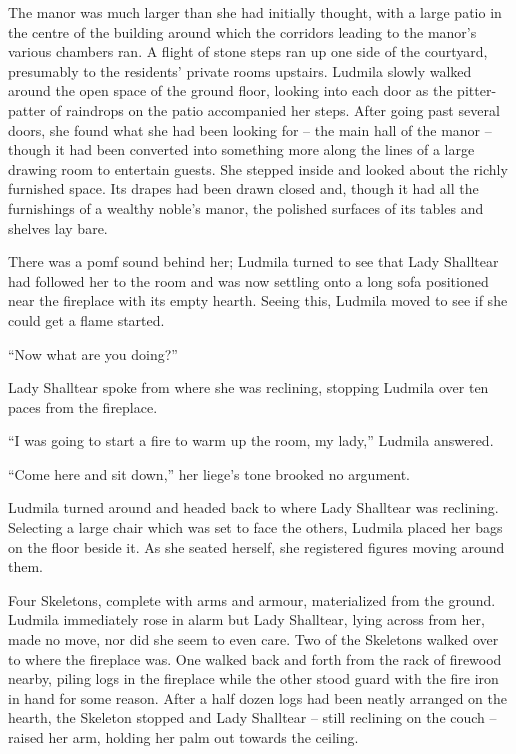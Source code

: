  

The manor was much larger than she had initially thought, with a large patio in the centre of the building around which the corridors leading to the manor's various chambers ran. A flight of stone steps ran up one side of the courtyard, presumably to the residents’ private rooms upstairs. Ludmila slowly walked around the open space of the ground floor, looking into each door as the pitter-patter of raindrops on the patio accompanied her steps. After going past several doors, she found what she had been looking for – the main hall of the manor – though it had been converted into something more along the lines of a large drawing room to entertain guests. She stepped inside and looked about the richly furnished space. Its drapes had been drawn closed and, though it had all the furnishings of a wealthy noble’s manor, the polished surfaces of its tables and shelves lay bare.

 

There was a pomf sound behind her; Ludmila turned to see that Lady Shalltear had followed her to the room and was now settling onto a long sofa positioned near the fireplace with its empty hearth. Seeing this, Ludmila moved to see if she could get a flame started.

 

“Now what are you doing?”

 

Lady Shalltear spoke from where she was reclining, stopping Ludmila over ten paces from the fireplace.

 

“I was going to start a fire to warm up the room, my lady,” Ludmila answered.

 

“Come here and sit down,” her liege’s tone brooked no argument.

 

Ludmila turned around and headed back to where Lady Shalltear was reclining. Selecting a large chair which was set to face the others, Ludmila placed her bags on the floor beside it. As she seated herself, she registered figures moving around them.

 

Four Skeletons, complete with arms and armour, materialized from the ground. Ludmila immediately rose in alarm but Lady Shalltear, lying across from her, made no move, nor did she seem to even care. Two of the Skeletons walked over to where the fireplace was. One walked back and forth from the rack of firewood nearby, piling logs in the fireplace while the other stood guard with the fire iron in hand for some reason. After a half dozen logs had been neatly arranged on the hearth, the Skeleton stopped and Lady Shalltear – still reclining on the couch – raised her arm, holding her palm out towards the ceiling.

